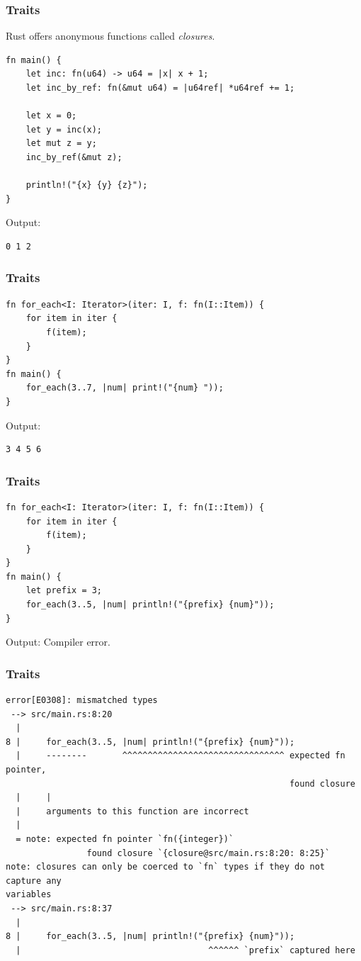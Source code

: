 \begin{frame}[fragile]
    \frametitle{Traits}
    Rust offers anonymous functions called \textit{closures}.
    \pause
    \vfill
    \begin{verbatim}
fn main() {
    let inc: fn(u64) -> u64 = |x| x + 1;
    let inc_by_ref: fn(&mut u64) = |u64ref| *u64ref += 1;

    let x = 0;
    let y = inc(x);
    let mut z = y;
    inc_by_ref(&mut z);

    println!("{x} {y} {z}");
}
    \end{verbatim}
    \vfill
    Output:
    \pause
    \begin{verbatim}
0 1 2
    \end{verbatim}
\end{frame}

\begin{frame}[fragile]
    \frametitle{Traits}
    \begin{verbatim}
fn for_each<I: Iterator>(iter: I, f: fn(I::Item)) {
    for item in iter {
        f(item);
    }
}
fn main() {
    for_each(3..7, |num| print!("{num} "));
}
    \end{verbatim}
    \vfill
    Output:
    \pause
    \begin{verbatim}
3 4 5 6 
    \end{verbatim}
\end{frame}

\begin{frame}[fragile]
    \frametitle{Traits}
    \begin{verbatim}
fn for_each<I: Iterator>(iter: I, f: fn(I::Item)) {
    for item in iter {
        f(item);
    }
}
fn main() {
    let prefix = 3;
    for_each(3..5, |num| println!("{prefix} {num}"));
}
    \end{verbatim}
    \vfill
    Output:
    \pause
    Compiler error.
\end{frame}

\begin{frame}[fragile]
    \frametitle{Traits}
    \begin{verbatim}
error[E0308]: mismatched types
 --> src/main.rs:8:20
  |
8 |     for_each(3..5, |num| println!("{prefix} {num}"));
  |     --------       ^^^^^^^^^^^^^^^^^^^^^^^^^^^^^^^^ expected fn pointer,
                                                        found closure
  |     |
  |     arguments to this function are incorrect
  |
  = note: expected fn pointer `fn({integer})`
                found closure `{closure@src/main.rs:8:20: 8:25}`
note: closures can only be coerced to `fn` types if they do not capture any
variables
 --> src/main.rs:8:37
  |
8 |     for_each(3..5, |num| println!("{prefix} {num}"));
  |                                     ^^^^^^ `prefix` captured here
    \end{verbatim}
\end{frame}

